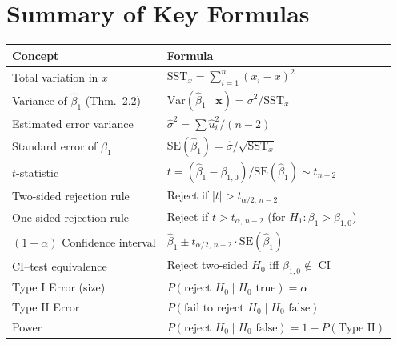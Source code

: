 \documentclass[11pt,a4paper]{article}
\begin{document}
\section*{Summary of Key Formulas}

\begin{center}
\renewcommand{\arraystretch}{1.6}
\begin{tabular}{ll}
\toprule
\textbf{Concept} & \textbf{Formula} \\
\midrule
Total variation in $x$ & $\text{SST}_x = \sum_{i=1}^n (x_i - \bar{x})^2$ \\
Variance of $\hat{\beta}_1$ (Thm.~2.2) & $\text{Var}(\hat{\beta}_1 \mid \mathbf{x}) = \sigma^2 / \text{SST}_x$ \;\\
Estimated error variance & $\hat{\sigma}^2 = \sum \hat{u}_i^2 / (n-2)$ \\
Standard error of $\hat{\beta}_1$ & $\text{SE}(\hat{\beta}_1) = \hat{\sigma} / \sqrt{\text{SST}_x}$ \\
$t$-statistic & $t = (\hat{\beta}_1 - \beta_{1,0}) / \text{SE}(\hat{\beta}_1) \sim t_{n-2}$ \;\\
Two-sided rejection rule & Reject if $|t| > t_{\alpha/2,\, n-2}$ \\
One-sided rejection rule & Reject if $t > t_{\alpha,\, n-2}$ \;\; (for $H_1\colon \beta_1 > \beta_{1,0}$) \\
$(1-\alpha)$ Confidence interval & $\hat{\beta}_1 \pm t_{\alpha/2,\, n-2} \cdot \text{SE}(\hat{\beta}_1)$ \\
CI--test equivalence & Reject two-sided $H_0$ iff $\beta_{1,0} \notin$ CI \\
\midrule
Type I Error (size) & $P(\text{reject } H_0 \mid H_0 \text{ true}) = \alpha$ \\
Type II Error & $P(\text{fail to reject } H_0 \mid H_0 \text{ false})$ \\
Power & $P(\text{reject } H_0 \mid H_0 \text{ false}) = 1 - P(\text{Type II})$ \\
\bottomrule
\end{tabular}
\end{center}
\end{document}
